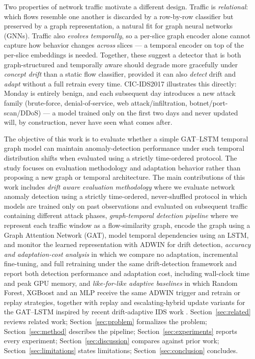 \documentclass[twocolumn]{llncs}
\begin{document}
Two properties of network traffic motivate a different design. Traffic is \emph{relational}: which
flows resemble one another is discarded by a row-by-row classifier but preserved by a graph
representation, a natural fit for graph neural networks (GNNs). Traffic also \emph{evolves
temporally}, so a per-slice graph encoder alone cannot capture how behavior changes \emph{across}
slices --- a temporal encoder on top of the per-slice embeddings is needed. Together, these suggest
a detector that is both graph-structured and temporally aware should degrade more gracefully under
\emph{concept drift} than a static flow classifier, provided it can also \emph{detect} drift and
\emph{adapt} without a full retrain every time. CIC-IDS2017 illustrates this directly: Monday is
entirely benign, and each subsequent day introduces a new attack family (brute-force,
denial-of-service, web attack/infiltration, botnet/port-scan/DDoS) --- a model trained only on the
first two days and never updated will, by construction, never have seen what comes after.

The objective of this work is to evaluate whether a simple GAT--LSTM temporal graph model can maintain anomaly-detection performance under such temporal distribution shifts when evaluated using a strictly time-ordered protocol. The study focuses on evaluation methodology and adaptation behavior rather than proposing a new graph or temporal architecture. The main contributions of  this work includes \textit{ drift aware evaluation methodology} where we evaluate network anomaly detection using a strictly time-ordered, never-shuffled protocol in which models are trained only on past observations and evaluated on subsequent traffic containing different attack phases,\textit{ graph-temporal detection pipeline} where we represent each traffic window as a flow-similarity graph, encode the graph using a Graph Attention Network (GAT), model temporal dependencies using an LSTM, and monitor the learned representation with ADWIN for drift detection,\textit{ accuracy and adaptation-cost analysis}  in which we compare no adaptation, incremental fine-tuning, and full retraining under the same drift-detection framework and report both detection performance and adaptation cost, including wall-clock time and peak GPU memory, and \textit{like-for-like adaptive baselines} in which Random Forest, XGBoost and an MLP receive the same ADWIN trigger and retrain or replay strategies, together with replay and escalating-hybrid update variants for the GAT--LSTM inspired by recent drift-adaptive IDS work \cite{zha2025anids,lu2025adaoil,cerasuolo2025adaptable}.  Section~\ref{sec:related} reviews related work; Section~\ref{sec:problem} formalizes the
problem; Section~\ref{sec:method} describes the pipeline; Section~\ref{sec:experiments} reports
every experiment; Section~\ref{sec:discussion} compares against prior work;
Section~\ref{sec:limitations} states limitations; Section~\ref{sec:conclusion} concludes.
\end{document}
